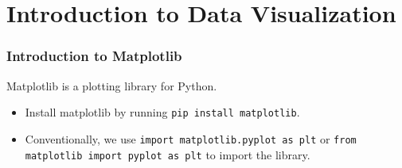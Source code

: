 \documentclass[beamer, en, version=2.0]{huangfusl-template}
\begin{document}
    \section{Introduction to Data Visualization}
    \begin{frame}[fragile]
        \frametitle{Introduction to Matplotlib}

        Matplotlib is a plotting library for Python.

        \begin{itemize}
            \item Install matplotlib by running {\color{darkred}\footnotesize\verb|pip install matplotlib|}.
            \item Conventionally, we use {\color{blue}\footnotesize\verb|import matplotlib.pyplot as plt|} or {\color{blue}\footnotesize\verb|from matplotlib import pyplot as plt|} to import the library.
        \end{itemize}
    \end{frame}
\end{document}
